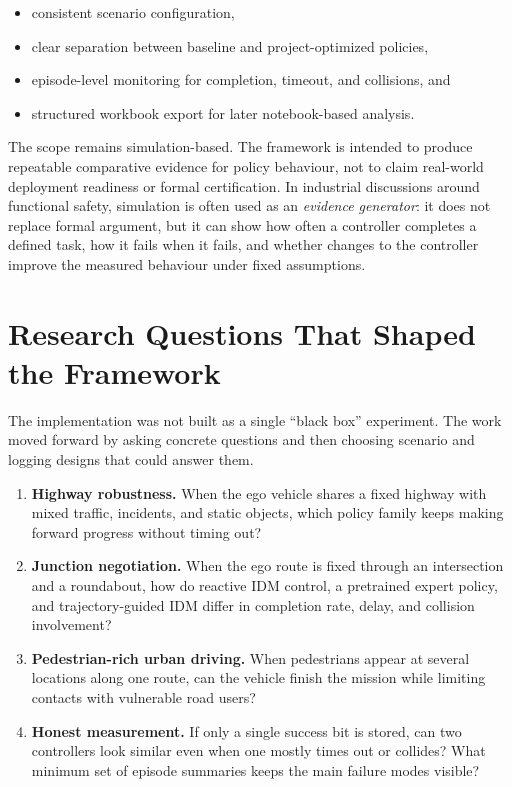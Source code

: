 \documentclass[12pt,a4paper]{report}
\begin{document}
\begin{itemize}
    \item consistent scenario configuration,
    \item clear separation between baseline and project-optimized policies,
    \item episode-level monitoring for completion, timeout, and collisions, and
    \item structured workbook export for later notebook-based analysis.
\end{itemize}

The scope remains simulation-based. The framework is intended to produce repeatable comparative evidence for policy behaviour, not to claim real-world deployment readiness or formal certification. In industrial discussions around functional safety, simulation is often used as an \emph{evidence generator}: it does not replace formal argument, but it can show how often a controller completes a defined task, how it fails when it fails, and whether changes to the controller improve the measured behaviour under fixed assumptions.

\section{Research Questions That Shaped the Framework}
The implementation was not built as a single ``black box'' experiment. The work moved forward by asking concrete questions and then choosing scenario and logging designs that could answer them.

\begin{enumerate}[label=\textbf{RQ\arabic*:}, leftmargin=2.0cm]
    \item \textbf{Highway robustness.} When the ego vehicle shares a fixed highway with mixed traffic, incidents, and static objects, which policy family keeps making forward progress without timing out?
    \item \textbf{Junction negotiation.} When the ego route is fixed through an intersection and a roundabout, how do reactive IDM control, a pretrained expert policy, and trajectory-guided IDM differ in completion rate, delay, and collision involvement?
    \item \textbf{Pedestrian-rich urban driving.} When pedestrians appear at several locations along one route, can the vehicle finish the mission while limiting contacts with vulnerable road users?
    \item \textbf{Honest measurement.} If only a single success bit is stored, can two controllers look similar even when one mostly times out or collides? What minimum set of episode summaries keeps the main failure modes visible?
\end{enumerate}
\end{document}
